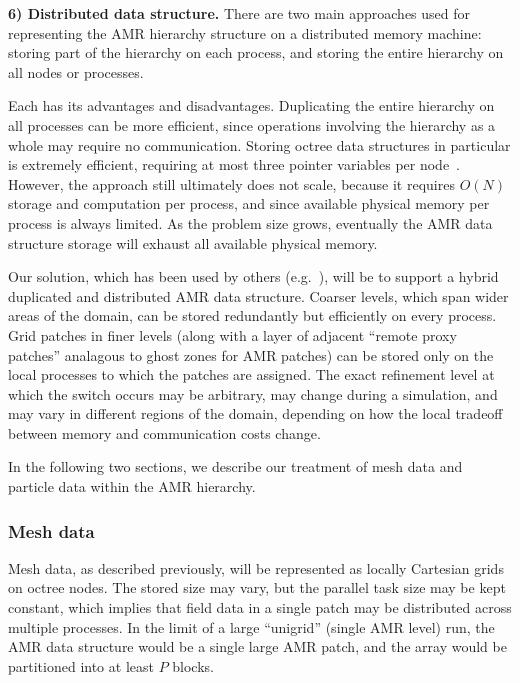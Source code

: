 \documentclass[10pt,twocolumn]{article}
\begin{document}
\textbf{6) Distributed data structure.} There are two main approaches
used for representing the AMR hierarchy structure on a distributed
memory machine: storing part of the hierarchy on each process, and
storing the entire hierarchy on all nodes or processes.

Each has its advantages and disadvantages.  Duplicating the entire
hierarchy on all processes can be more efficient, since operations
involving the hierarchy as a whole may require no communication.
Storing octree data structures in particular is extremely efficient,
requiring at most three pointer variables per node~\cite{FrPe02}.
However, the approach still ultimately does not scale, because it
requires $O(N)$ storage and computation per process, and since
available physical memory per process is always limited.  As the
problem size grows, eventually the AMR data structure storage will
exhaust all available physical memory.

Our solution, which has been used by others
(e.g.~\cite{@@@hybrid-storage}), will be to support a hybrid
duplicated and distributed AMR data structure.  Coarser levels, which
span wider areas of the domain, can be stored redundantly but
efficiently on every process.  Grid patches in finer levels (along
with a layer of adjacent ``remote proxy patches'' analagous to ghost
zones for AMR patches) can be stored only on the local processes to
which the patches are assigned.  The exact refinement level at which
the switch occurs may be arbitrary, may change during a simulation,
and may vary in different regions of the domain, depending on how the
local tradeoff between memory and communication costs change.

In the following two sections, we describe our treatment of mesh data
and particle data within the AMR hierarchy.

\subsubsection{Mesh data} \label{sss:design-fields}

Mesh data, as described previously, will be represented as locally
Cartesian grids on octree nodes.  The stored size may vary, but the
parallel task size may be kept constant, which implies that field data
in a single patch may be distributed across multiple processes.  In
the limit of a large ``unigrid'' (single AMR level) run, the AMR data
structure would be a single large AMR patch, and the array would be
partitioned into at least $P$ blocks.
\end{document}
